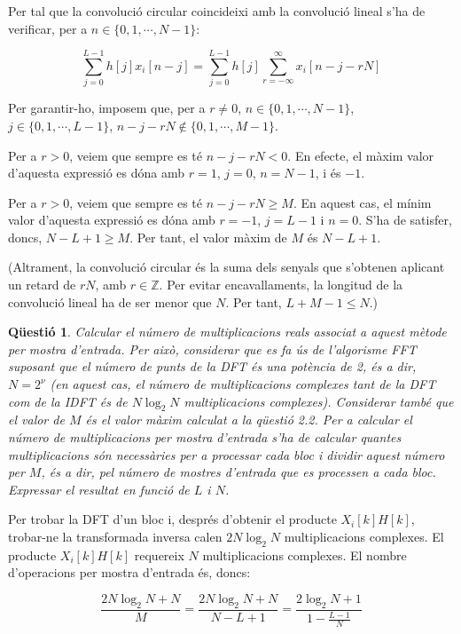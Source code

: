 \documentclass[11pt,a4]{article}
\numberwithin{equation}{section}
\theoremstyle{thmstyle}
\theoremstyle{thmstyle}
\theoremstyle{thmstyle}
\theoremstyle{thmstyle}
\theoremstyle{thmstyle}
\theoremstyle{thmstyle}
\newtheorem{question}{Qüestió}
\theoremstyle{thmstyle}
\begin{document}
Per tal que la convolució circular coincideixi amb la convolució lineal s'ha de verificar, per a $n\in\lbrace 0, 1, \cdots, N-1 \rbrace$:

$$
\sum_{j=0}^{L-1} h[j]x_i[n-j] = \sum_{j=0}^{L-1} h[j]\sum_{r=-\infty}^{\infty}x_i[n-j-rN]
$$

Per garantir-ho, imposem que, per a $r\neq 0$, $n\in\lbrace 0, 1, \cdots, N-1 \rbrace$, $j\in\lbrace 0, 1, \cdots, L-1 \rbrace$, $n-j-rN\not\in \lbrace 0, 1, \cdots, M-1 \rbrace$.

Per a $r>0$, veiem que sempre es té $n-j-rN<0$. En efecte, el màxim valor d'aquesta expressió es dóna amb $r = 1$, $j=0$, $n=N-1$, i és $-1$.

Per a $r>0$, veiem que sempre es té $n-j-rN\geqslant M$. En aquest cas, el mínim valor d'aquesta expressió es dóna amb $r = -1$, $j=L-1$ i $n=0$. S'ha de satisfer, doncs, $N-L+1\geqslant M$. Per tant, el valor màxim de $M$ és $N-L+1$.

(Altrament, la convolució circular és la suma dels senyals que s'obtenen aplicant un retard de $rN$, amb $r\in\mathbb{Z}$. Per evitar encavallaments, la longitud de la convolució lineal ha de ser menor que $N$. Per tant, $L+M-1\leqslant N$.)

\begin{question}
Calcular el número de multiplicacions reals associat a aquest mètode per mostra d’entrada. Per això, considerar que es fa ús de l’algorisme FFT suposant que el número de punts de la DFT és una potència de 2, és a dir, $N=2^\nu$ (en aquest cas, el número de multiplicacions complexes tant de la DFT com de la IDFT és de $N\log_2 N$ multiplicacions complexes). Considerar també que el valor de $M$ és el valor màxim calculat
a la qüestió 2.2. Per a calcular el número de multiplicacions per mostra d’entrada s’ha de calcular quantes multiplicacions són necessàries per a processar cada bloc i dividir aquest número per $M$, és a dir, pel número de mostres d’entrada que es processen a cada bloc. Expressar el resultat en funció de $L$ i $N$.
\end{question}

Per trobar la DFT d'un bloc i, després d'obtenir el producte $X_i[k]H[k]$, trobar-ne la transformada inversa calen $2N\log_2 N$ multiplicacions complexes. El producte $X_i[k]H[k]$ requereix $N$ multiplicacions complexes. El nombre d'operacions per mostra d'entrada és, doncs:

$$
\frac{2N\log_2 N + N}{M} = \frac{2N\log_2 N + N}{N-L+1} = \frac{2\log_2 N + 1}{1-\frac{L-1}{N}}
$$
\end{document}

